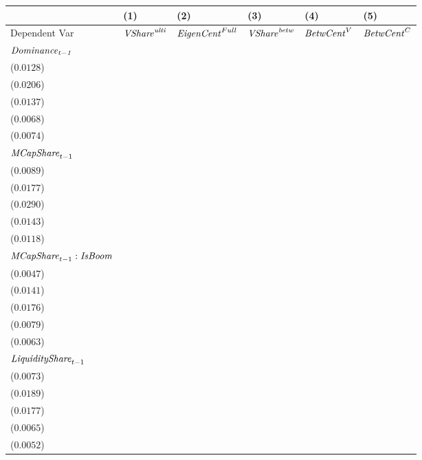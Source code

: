 \begin{tabular}{llllll}
\toprule
{} &                                       (1) &                                       (2) &                                       (3) &                                       (4) &                                       (5) \\
\midrule
Dependent Var                             &                 ${\it VShare}^{\it ulti}$ &                  ${\it EigenCent}^{Full}$ &                 ${\it VShare}^{\it betw}$ &                        ${\it BetwCent}^V$ &                        ${\it BetwCent}^C$ \\
$\it Dominance_{t-1}$                     &   \makecell{$0.8681^{***}$ \\ ($0.0128$)} &   \makecell{$0.8160^{***}$ \\ ($0.0206$)} &   \makecell{$0.8704^{***}$ \\ ($0.0137$)} &   \makecell{$0.9484^{***}$ \\ ($0.0068$)} &   \makecell{$0.9492^{***}$ \\ ($0.0074$)} \\
${\it MCapShare}_{t-1}$                   &      \makecell{$0.0113^{}$ \\ ($0.0089$)} &     \makecell{$-0.0092^{}$ \\ ($0.0177$)} &     \makecell{$-0.0031^{}$ \\ ($0.0290$)} &     \makecell{$0.0245^{*}$ \\ ($0.0143$)} &    \makecell{$0.0296^{**}$ \\ ($0.0118$)} \\
${\it MCapShare}_{t-1}:{\it IsBoom}$      &     \makecell{$-0.0003^{}$ \\ ($0.0047$)} &     \makecell{$-0.0228^{}$ \\ ($0.0141$)} &   \makecell{$0.0828^{***}$ \\ ($0.0176$)} &   \makecell{$0.0279^{***}$ \\ ($0.0079$)} &    \makecell{$0.0142^{**}$ \\ ($0.0063$)} \\
${\it LiquidityShare}_{t-1}$              &   \makecell{$0.0480^{***}$ \\ ($0.0073$)} &   \makecell{$0.0771^{***}$ \\ ($0.0189$)} &   \makecell{$0.1099^{***}$ \\ ($0.0177$)} &   \makecell{$0.0184^{***}$ \\ ($0.0065$)} &   \makecell{$0.0151^{***}$ \\ ($0.0052$)} \\

\end{tabular}
